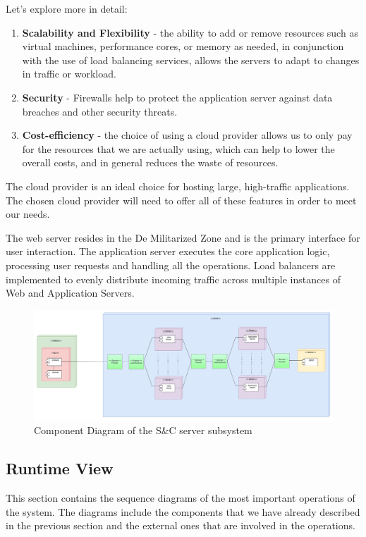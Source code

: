 \documentclass[a4paper,12pt]{article}
\begin{document}
Let's explore more in detail:

\begin{enumerate}
    \item \textbf{Scalability and Flexibility} - the ability to add or remove resources such as virtual machines, performance cores, or memory as needed, in conjunction with the use of load balancing services, allows the servers to adapt to changes in traffic or workload.
    \item \textbf{Security} - Firewalls help to protect the application server against data breaches and other security threats.
    \item \textbf{Cost-efficiency} - the choice of using a cloud provider allows us to only pay for the resources that we are actually using, which can help to lower the overall costs, and in general reduces the waste of resources.
\end{enumerate}

The cloud provider is an ideal choice for hosting large, high-traffic applications. The chosen cloud provider will need to offer all of these features in order to meet our needs.

The web server resides in the De Militarized Zone and is the primary interface for user interaction. The application server executes the core application logic, processing user requests and handling all the operations. Load balancers are implemented to evenly distribute incoming traffic across multiple instances of Web and Application Servers.
\begin{figure}[H]
    \centering
    \includegraphics[scale = 0.33]{DD_figures/SingleDiagrams/DeploymentView.png}
    \caption{Component Diagram of the S\&C server subsystem}
    \centering
\end{figure}

\subsection{Runtime View}
This section contains the sequence diagrams of the most important operations of the
system. The diagrams include the components that we have already described in the
previous section and the external ones that are involved in the operations.
\end{document}
